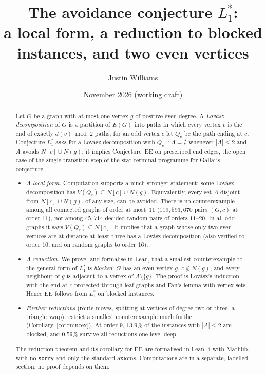 \documentclass[11pt]{amsart}
\title[The avoidance conjecture $L_1^*$]{The avoidance conjecture $L_1^*$:\\ a local form, a
reduction to blocked instances, and two even vertices}
\author{Justin Williams}
\date{November 2026 (working draft)}
\theoremstyle{definition}
\begin{document}
\begin{abstract}
Let $G$ be a graph with at most one vertex $g$ of positive even degree. A \emph{Lov\'asz
decomposition} of $G$ is a partition of $E(G)$ into paths in which every vertex $v$ is the end of
exactly $d(v)\bmod 2$ paths; for an odd vertex $c$ let $Q_c$ be the path ending at $c$. Conjecture
$L_1^*$ asks for a Lov\'asz decomposition with $Q_c\cap A=\emptyset$ whenever $|A|\le2$ and $A$
avoids $N[c]\cup N(g)$; it implies Conjecture~EE on prescribed end edges, the open case of the
single-transition step of the star-terminal programme for Gallai's conjecture.

\begin{itemize}
\item \emph{A local form.} Computation supports a much stronger statement: some Lov\'asz
decomposition has $V(Q_c)\subseteq N[c]\cup N(g)$. Equivalently, every set $A$ disjoint from
$N[c]\cup N(g)$, of any size, can be avoided. There is no counterexample among all connected graphs
of order at most~$11$ ($119{,}593{,}670$ pairs $(G,c)$ at order $11$), nor among $45{,}714$ decided
random pairs of orders $11$--$20$. In all-odd graphs it says $V(Q_c)\subseteq N[c]$. It implies that
a graph whose only two even vertices are at distance at least three has a Lov\'asz decomposition
(also verified to order $10$, and on random graphs to order $16$).
\item \emph{A reduction.} We prove, and formalise in Lean, that a smallest counterexample to the
general form of $L_1^*$ is \emph{blocked}: $G$ has an even vertex $g$, $c\notin N(g)$, and every
neighbour of $g$ is adjacent to a vertex of $A\setminus\{g\}$. The proof is Lov\'asz's induction with
the end at $c$ protected through leaf graphs and Fan's lemma with vertex sets. Hence EE follows from
$L_1^*$ on blocked instances.
\item \emph{Further reductions} (route moves, splitting at vertices of degree two or three, a
triangle swap) restrict a smallest counterexample much further
(Corollary~\ref{cor:mincex}). At order $9$, $13.9\%$ of the instances with $|A|\le2$ are blocked,
and $0.59\%$ survive all reductions one level deep.
\end{itemize}
The reduction theorem and its corollary for EE are formalised in Lean~4 with Mathlib, with no
\texttt{sorry} and only the standard axioms. Computations are in a separate, labelled section; no
proof depends on them.
\end{abstract}
\maketitle
\end{document}
